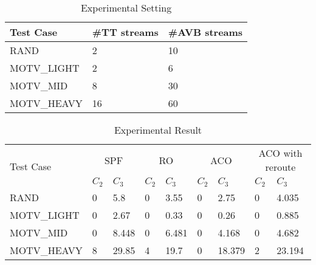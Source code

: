\begin{table}
	\begin{center}
		\begin{tabular}[t]{lll}
			\hline
			Test Case   & \#TT streams & \#AVB streams \\
			\hline
			RAND        &2             &10 \\
			\hline
			MOTV\_LIGHT &2             &6  \\
			\hline
			MOTV\_MID   &8             &30 \\
			\hline
			MOTV\_HEAVY &16            &60 \\
			\hline
		\end{tabular}
		\caption[Experimental Setting]{\small Experimental Setting } \label{t:expsetting}
	\end{center}
\end{table}

\begin{table}
	\begin{center}
		\begin{tabular}{l|llllllll}
			\hline
			\multirow{2}{*}{Test Case} &
			\multicolumn{2}{c}{SPF} &
			\multicolumn{2}{c}{RO} &
			\multicolumn{2}{c}{ACO} &
			\multicolumn{2}{c}{ACO with reroute} \\
			            & {$C_2$} & {$C_3$} & {$C_2$} & {$C_3$} & {$C_2$} & {$C_3$} & {$C_2$} & {$C_3$} \\
			\hline
			RAND        & 0       & 5.8     & 0       & 3.55    & 0       & 2.75    & 0       & 4.035   \\
			\hline
			MOTV\_LIGHT & 0       & 2.67    & 0       & 0.33    & 0       & 0.26    & 0       & 0.885   \\
			\hline
			MOTV\_MID   & 0       & 8.448   & 0       & 6.481   & 0       & 4.168   & 0       & 4.682   \\
			\hline
			MOTV\_HEAVY & 8       & 29.85   & 4       & 19.7    & 0       & 18.379  & 2       & 23.194  \\
			\hline
		\end{tabular}
		\caption[Experimental Result]{\small Experimental Result } \label{t:experiment}
	\end{center}
\end{table}